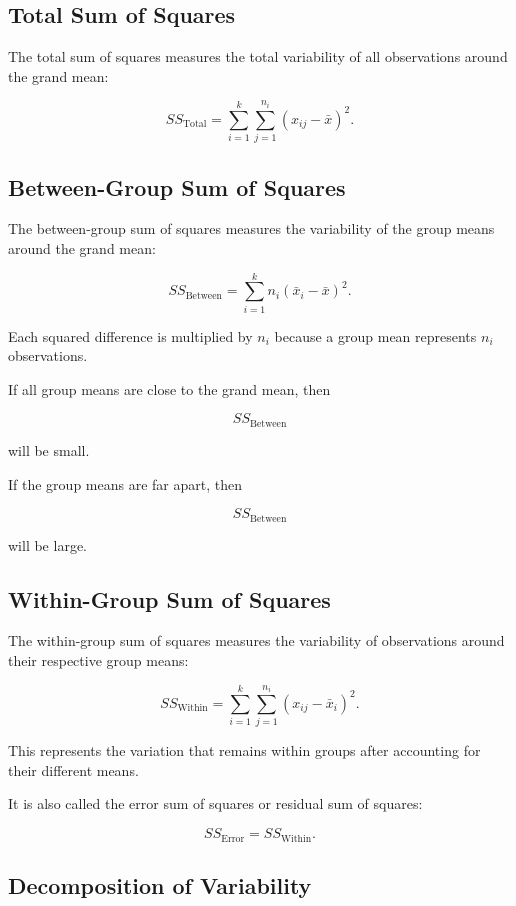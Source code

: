 \documentclass[11pt]{article}
\begin{document}
\subsection{Total Sum of Squares}

The total sum of squares measures the total variability of all
observations around the grand mean:

\[
\boxed{
SS_{\mathrm{Total}}
=
\sum_{i=1}^{k}
\sum_{j=1}^{n_i}
(x_{ij}-\bar{x})^2.
}
\]

\subsection{Between-Group Sum of Squares}

The between-group sum of squares measures the variability of the group
means around the grand mean:

\[
\boxed{
SS_{\mathrm{Between}}
=
\sum_{i=1}^{k}
n_i(\bar{x}_i-\bar{x})^2.
}
\]

Each squared difference is multiplied by \(n_i\) because a group mean
represents \(n_i\) observations.

If all group means are close to the grand mean, then

\[
SS_{\mathrm{Between}}
\]

will be small.

If the group means are far apart, then

\[
SS_{\mathrm{Between}}
\]

will be large.

\subsection{Within-Group Sum of Squares}

The within-group sum of squares measures the variability of observations
around their respective group means:

\[
\boxed{
SS_{\mathrm{Within}}
=
\sum_{i=1}^{k}
\sum_{j=1}^{n_i}
(x_{ij}-\bar{x}_i)^2.
}
\]

This represents the variation that remains within groups after accounting
for their different means.

It is also called the error sum of squares or residual sum of squares:

\[
SS_{\mathrm{Error}}=SS_{\mathrm{Within}}.
\]

\subsection{Decomposition of Variability}
\end{document}

